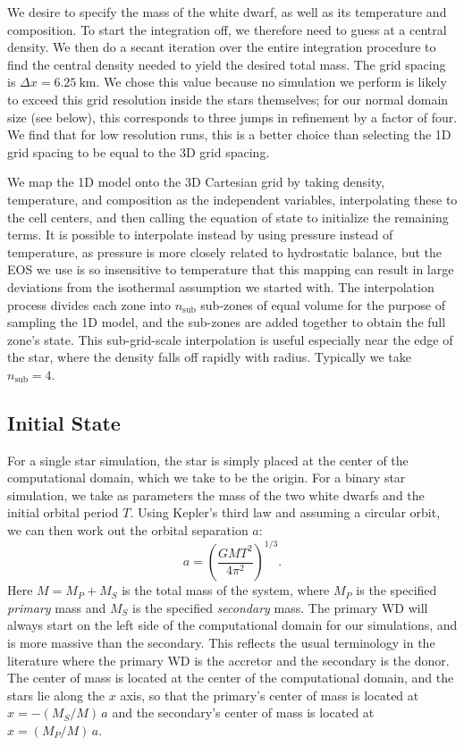 \documentclass[iop]{../emulateapj}
\begin{document}
We desire to specify the mass of the white dwarf, as well as its
temperature and composition. To start the integration off, we
therefore need to guess at a central density.  We then do a secant
iteration over the entire integration procedure to find the central
density needed to yield the desired total mass.  The grid spacing is
$\Delta x = 6.25\ \text{km}$. We chose this value because no simulation
we perform is likely to exceed this grid resolution inside the stars 
themselves; for our normal domain size (see below), this corresponds to 
three jumps in refinement by a factor of four. We find that for low 
resolution runs, this is a better choice than selecting the 1D grid 
spacing to be equal to the 3D grid spacing.

We map the 1D model onto the 3D Cartesian grid by taking density,
temperature, and composition as the independent variables,
interpolating these to the cell centers, and then calling the equation
of state to initialize the remaining terms. It is possible to interpolate
instead by using pressure instead of temperature, as pressure is more 
closely related to hydrostatic balance, but the EOS we use is so 
insensitive to temperature that this mapping can result in large 
deviations from the isothermal assumption we started with.  The 
interpolation process divides each zone into $n_{\text{sub}}$ 
sub-zones of equal volume for
the purpose of sampling the 1D model, and the sub-zones are added
together to obtain the full zone's state. This
sub-grid-scale interpolation is useful especially near the edge of the star,
where the density falls off rapidly with radius. Typically we take 
$n_{\text{sub}} = 4$.

\subsection{Initial State}
\label{sec:initial_state}

For a single star simulation, the star is simply placed at the center
of the computational domain, which we take to be the origin. For a
binary star simulation, we take as parameters the mass of the two
white dwarfs and the initial orbital period $T$. Using Kepler's third
law and assuming a circular orbit, we can then work out the orbital
separation $a$:
\begin{equation}
  a = \left(\frac{GM T^2}{4\pi^2}\right)^{1/3}.
\end{equation}
Here $M = M_P + M_S$ is the total mass of the system, where $M_P$ is
the specified \textit{primary} mass and $M_S$ is the specified
\textit{secondary} mass. The primary WD will always start on the left
side of the computational domain for our simulations, and is more
massive than the secondary. This reflects the usual terminology in the
literature where the primary WD is the accretor and the secondary is
the donor. The center of mass is located at the center of the
computational domain, and the stars lie along the $x$ axis, so that
the primary's center of mass is located at $x = -(M_S / M)\, a$ and
the secondary's center of mass is located at $x = (M_P / M)\, a$.
\end{document}
